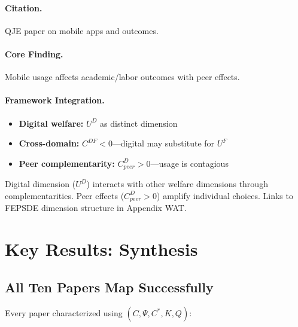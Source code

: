 \paragraph{Citation.}
QJE paper on mobile apps and outcomes.

\paragraph{Core Finding.}
Mobile usage affects academic/labor outcomes with peer effects.

\paragraph{Framework Integration.}
\begin{itemize}
  \item \textbf{Digital welfare:} $U^D$ as distinct dimension
  \item \textbf{Cross-domain:} $C^{DF} < 0$---digital may substitute for $U^F$
  \item \textbf{Peer complementarity:} $C^{D}_{peer} > 0$---usage is contagious
\end{itemize}

\begin{tcolorbox}[colback=yellow!5!white, colframe=yellow!75!black,
    title=EBF Insight: Digital Behavior]
Digital dimension ($U^D$) interacts with other welfare dimensions through
complementarities. Peer effects ($C^D_{peer} > 0$) amplify individual choices.
Links to FEPSDE dimension structure in Appendix WAT.
\end{tcolorbox}


\section{Key Results: Synthesis}
\label{sec:J-results}

\subsection{All Ten Papers Map Successfully}

Every paper characterized using $(C, \Psi, C^*, K, Q)$:

